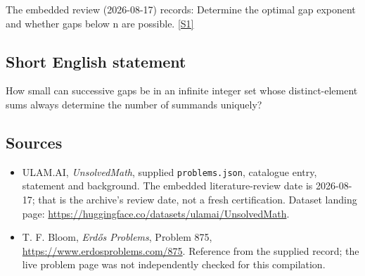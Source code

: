 \documentclass[11pt,a4paper]{article}
\newcommand{\sref}[2]{\hyperlink{source:#1:#2}{[S#2]}}
\begin{document}
The embedded review (2026-08-17) records: Determine the optimal gap exponent and whether gaps below n are possible. \sref{statement}{1}

\subsection{Short English statement}

How small can successive gaps be in an infinite integer set whose distinct-element sums always determine the number of summands uniquely?

\subsection{Sources}

{\small

\begin{itemize}

\item[\hypertarget{source:statement:1}{S1}] ULAM.AI, \emph{UnsolvedMath}, supplied \texttt{problems.json}, catalogue entry, statement and background. The embedded literature-review date is 2026-08-17; that is the archive’s review date, not a fresh certification. Dataset landing page: \url{https://huggingface.co/datasets/ulamai/UnsolvedMath}.

\item[\hypertarget{source:statement:2}{S2}] T. F. Bloom, \emph{Erdős Problems}, Problem 875, \url{https://www.erdosproblems.com/875}. Reference from the supplied record; the live problem page was not independently checked for this compilation.

\end{itemize}

}

\label{end:statement}
\end{document}
